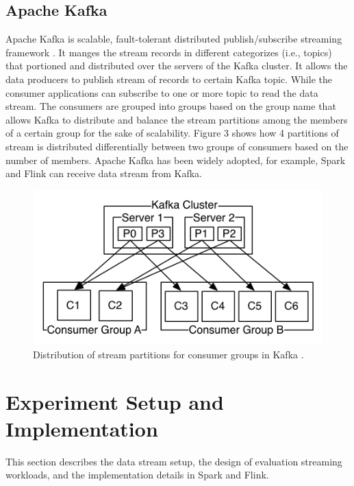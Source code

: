 \documentclass[]{article}
\begin{document}
\subsection{Apache Kafka}
\par Apache Kafka is scalable, fault-tolerant distributed publish/subscribe streaming framework \cite{kafka}.
It manges the stream records in different categorizes (i.e., topics) that portioned and distributed over the servers of the Kafka cluster. It allows the data producers to publish stream of records to certain Kafka topic. While the consumer applications can subscribe to one or more topic to read the data stream. The consumers are grouped into groups based on the group name that allows Kafka to distribute and balance the stream partitions among the  members of a certain group for the sake of scalability. Figure 3 shows how 4 partitions of stream is distributed differentially between two groups of consumers based on the number of members. 
Apache Kafka has been widely  adopted, for example, 
Spark and Flink can receive data stream from Kafka. 

\begin{figure}[h]
 
  \centering
    \includegraphics[width=\textwidth, height=.3\textheight]{kafka_groups.png}
     \caption{ Distribution of stream partitions for consumer groups in Kafka \cite{kafka}.}
\end{figure} 

\section{Experiment Setup and Implementation}
This section describes the data stream setup, the design of evaluation streaming workloads, and the implementation details in Spark and Flink.
\end{document}
